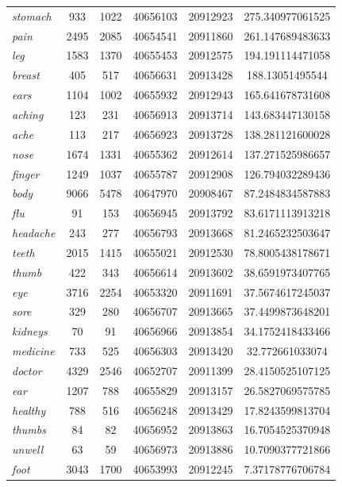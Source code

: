 \begin{table}
{\begin{tabular}[t]{l *{2}{S[table-format=5]} *{2}{S[table-format=8]} S[table-format=4.2]}
\textit{stomach} & 933 & 1022 & 40656103 & 20912923 & 275.340977061525 \\
\textit{pain} & 2495 & 2085 & 40654541 & 20911860 & 261.147689483633 \\
\textit{leg} & 1583 & 1370 & 40655453 & 20912575 & 194.191114471058 \\
\textit{breast} & 405 & 517 & 40656631 & 20913428 & 188.13051495544 \\
\textit{ears} & 1104 & 1002 & 40655932 & 20912943 & 165.641678731608 \\
\textit{aching} & 123 & 231 & 40656913 & 20913714 & 143.683447130158 \\
\textit{ache} & 113 & 217 & 40656923 & 20913728 & 138.281121600028 \\
\textit{nose} & 1674 & 1331 & 40655362 & 20912614 & 137.271525986657 \\
\textit{finger} & 1249 & 1037 & 40655787 & 20912908 & 126.794032289436 \\
\textit{body} & 9066 & 5478 & 40647970 & 20908467 & 87.2484834587883 \\
\textit{flu} & 91 & 153 & 40656945 & 20913792 & 83.6171113913218 \\
\textit{headache} & 243 & 277 & 40656793 & 20913668 & 81.2465232503647 \\
\textit{teeth} & 2015 & 1415 & 40655021 & 20912530 & 78.8005438178671 \\
\textit{thumb} & 422 & 343 & 40656614 & 20913602 & 38.6591973407765 \\
\textit{eye} & 3716 & 2254 & 40653320 & 20911691 & 37.5674617245037 \\
\textit{sore} & 329 & 280 & 40656707 & 20913665 & 37.4499873648201 \\
\textit{kidneys} & 70 & 91 & 40656966 & 20913854 & 34.1752418433466 \\
\textit{medicine} & 733 & 525 & 40656303 & 20913420 & 32.772661033074 \\
\textit{doctor} & 4329 & 2546 & 40652707 & 20911399 & 28.4150525107125 \\
\textit{ear} & 1207 & 788 & 40655829 & 20913157 & 26.5827069575785 \\
\textit{healthy} & 788 & 516 & 40656248 & 20913429 & 17.8243599813704 \\
\textit{thumbs} & 84 & 82 & 40656952 & 20913863 & 16.7054525370948 \\
\textit{unwell} & 63 & 59 & 40656973 & 20913886 & 10.7090377721866 \\
\textit{foot} & 3043 & 1700 & 40653993 & 20912245 & 7.37178776706784 \\

\end{tabular}}
\end{table}
